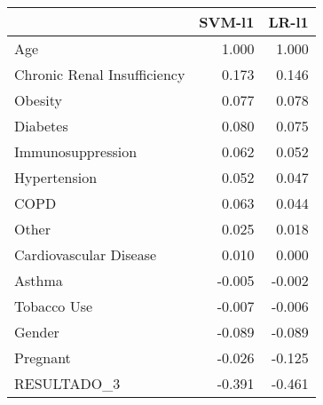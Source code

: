 \begin{tabular}{lrr}
\toprule
{} &  SVM-l1 &  LR-l1 \\
\midrule
Age                         &   1.000 &  1.000 \\
Chronic Renal Insufficiency &   0.173 &  0.146 \\
Obesity                     &   0.077 &  0.078 \\
Diabetes                    &   0.080 &  0.075 \\
Immunosuppression           &   0.062 &  0.052 \\
Hypertension                &   0.052 &  0.047 \\
COPD                        &   0.063 &  0.044 \\
Other                       &   0.025 &  0.018 \\
Cardiovascular Disease      &   0.010 &  0.000 \\
Asthma                      &  -0.005 & -0.002 \\
Tobacco Use                 &  -0.007 & -0.006 \\
Gender                      &  -0.089 & -0.089 \\
Pregnant                    &  -0.026 & -0.125 \\
RESULTADO\_3                 &  -0.391 & -0.461 \\
\bottomrule
\end{tabular}
